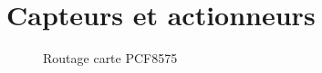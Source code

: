 
\chapter{Capteurs et actionneurs}
\label{sec:FrontPanel}

\begin{figure}[htpb]
  \centering
  \caption{Routage carte PCF8575}
  \label{fig:FrontPanel}
\end{figure}